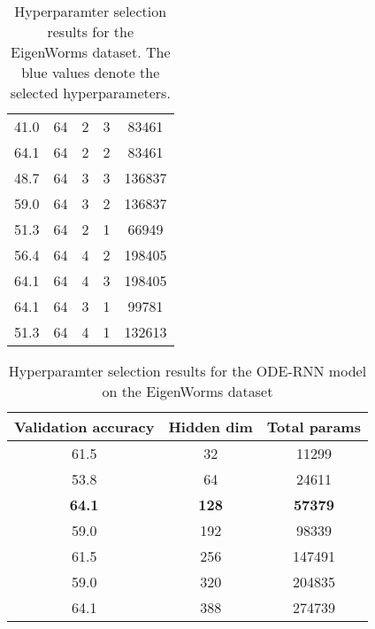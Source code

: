 \documentclass{article}
\begin{document}
\begin{table*}[t]
\begin{center}
\begin{tabular}{ccccc}
        41.0 &         64 &                        2 &          3 &       83461 \\
        64.1 &         64 &                        2 &          2 &       83461 \\
        48.7 &         64 &                        3 &          3 &      136837 \\
        59.0 &         64 &                        3 &          2 &      136837 \\
        51.3 &         64 &                        2 &          1 &       66949 \\
        56.4 &         64 &                        4 &          2 &      198405 \\
        64.1 &         64 &                        4 &          3 &      198405 \\
        64.1 &         64 &                        3 &          1 &       99781 \\
        51.3 &         64 &                        4 &          1 &      132613 \\
        \bottomrule
        \end{tabular}
    \end{center}
    \caption{Hyperparamter selection results for the EigenWorms dataset. The blue values denote the selected hyperparameters.}
    \label{tab:eigenworms_hyper}
\end{table*}  
\begin{table*}[t]
    \scriptsize
    \begin{center}
        \begin{tabular}{ccc}
        \toprule
        \textbf{Validation accuracy} & \textbf{Hidden dim} & \textbf{Total params} \\
        \midrule
        61.5 &               32 &       11299 \\
        53.8 &               64 &       24611 \\
        \textbf{64.1} &              \textbf{128} &       \textbf{57379} \\
        59.0 &              192 &       98339 \\
        61.5 &              256 &      147491 \\
        59.0 &              320 &      204835 \\
        64.1 &              388 &      274739 \\
        \bottomrule
        \end{tabular}
    \end{center}
    \caption{Hyperparamter selection results for the ODE-RNN model on the EigenWorms dataset}
    \label{tab:eigenworms_hyper_odernn}
\end{table*}
\end{document}
